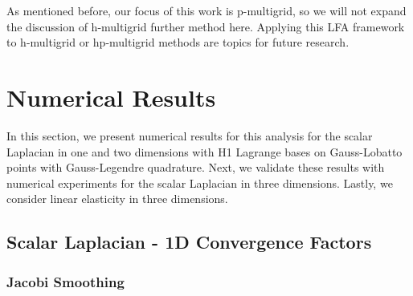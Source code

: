 \documentclass[review]{siamart190516}
\begin{document}
As mentioned before, our focus of this work is p-multigrid, so we will not expand the discussion of h-multigrid further method here.
Applying this LFA framework to h-multigrid or hp-multigrid methods are topics for future research.

\section{Numerical Results}\label{sec:results}

In this section, we present numerical results for this analysis for the scalar Laplacian in one and two dimensions with H1 Lagrange bases on Gauss-Lobatto points with Gauss-Legendre quadrature.
Next, we validate these results with numerical experiments for the scalar Laplacian in three dimensions.
Lastly, we consider linear elasticity in three dimensions.

\subsection{Scalar Laplacian - 1D Convergence Factors}\label{sec:1dresults}

\subsubsection{Jacobi Smoothing}
\end{document}
